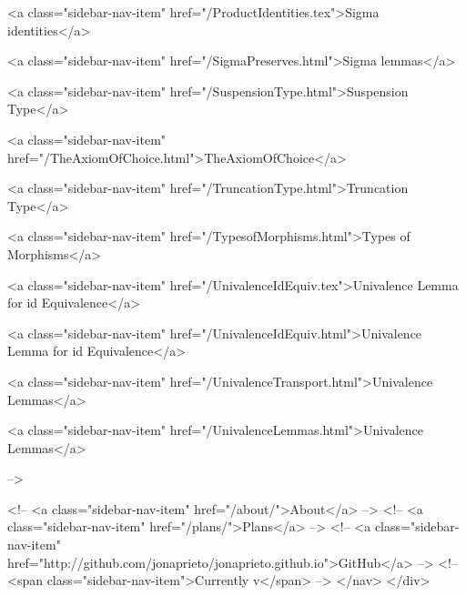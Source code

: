       
    
      
        
          <a class="sidebar-nav-item" href="/ProductIdentities.tex">Sigma identities</a>
        
      
    
      
        
          <a class="sidebar-nav-item" href="/SigmaPreserves.html">Sigma lemmas</a>
        
      
    
      
        
          <a class="sidebar-nav-item" href="/SuspensionType.html">Suspension Type</a>
        
      
    
      
        
          <a class="sidebar-nav-item" href="/TheAxiomOfChoice.html">TheAxiomOfChoice</a>
        
      
    
      
        
          <a class="sidebar-nav-item" href="/TruncationType.html">Truncation Type</a>
        
      
    
      
        
          <a class="sidebar-nav-item" href="/TypesofMorphisms.html">Types of Morphisms</a>
        
      
    
      
        
          <a class="sidebar-nav-item" href="/UnivalenceIdEquiv.tex">Univalence Lemma for id Equivalence</a>
        
      
    
      
        
          <a class="sidebar-nav-item" href="/UnivalenceIdEquiv.html">Univalence Lemma for id Equivalence</a>
        
      
    
      
        
          <a class="sidebar-nav-item" href="/UnivalenceTransport.html">Univalence Lemmas</a>
        
      
    
      
        
          <a class="sidebar-nav-item" href="/UnivalenceLemmas.html">Univalence Lemmas</a>
        
      
     -->

    <!-- <a class="sidebar-nav-item" href="/about/">About</a> -->
    <!-- <a class="sidebar-nav-item" href="/plans/">Plans</a> -->
    <!-- <a class="sidebar-nav-item" href="http://github.com/jonaprieto/jonaprieto.github.io">GitHub</a> -->
    <!-- <span class="sidebar-nav-item">Currently v</span> -->
  </nav>
</div>

